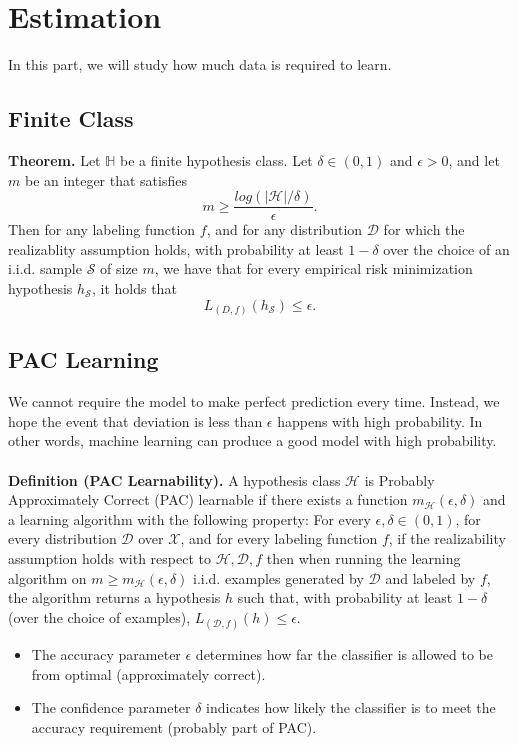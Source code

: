 \documentclass{article}
\begin{document}
   \clearpage
   \section{Estimation}
   In this part, we will study how much data is required to learn.
   \subsection{Finite Class}
   \textbf{Theorem.} Let $\mathbb{H}$ be a finite hypothesis class. Let $\delta \in (0,1)$ and $\epsilon > 0$, and let $m$ be an integer that satisfies 
   \begin{equation}
   m \geq \frac{log(|\mathcal{H}|/\delta)}{\epsilon}.
   \end{equation}
   Then for any labeling function $f$, and for any distribution $\mathcal{D}$ for which the realizablity assumption holds, with probability at least $1 - \delta$ over the choice of an i.i.d. sample $\mathcal{S}$ of size $m$, we have that for every empirical risk minimization hypothesis $h_\mathcal{S}$, it holds that 
   \begin{equation}
   L_{(D,f)}(h_\mathcal{S}) \leq \epsilon.
   \end{equation}
   
   \subsection{PAC Learning}
   We cannot require the model to make perfect prediction every time. Instead, we hope the event that deviation is less than $\epsilon$ happens with high probability. In other words, machine learning can produce a good model with high probability.
   \\\\
   \textbf{Definition (PAC Learnability).} A hypothesis class $\mathcal{H}$ is Probably Approximately Correct (PAC) learnable if there exists a function $m_\mathcal{H}(\epsilon,\delta)$ and a learning algorithm with the following property: For every $\epsilon,\delta \in (0,1)$,  for every distribution $\mathcal{D}$ over $\mathcal{X}$, and for every labeling function $f$, if the realizability assumption holds with respect to $\mathcal{H}, \mathcal{D}, f$ then when running the learning algorithm on $m \geq m_\mathcal{H}(\epsilon,\delta)$ i.i.d. examples generated by $\mathcal{D}$ and labeled by $f$, the algorithm returns a hypothesis $h$ such that, with probability at least $1-\delta$ (over the choice of examples), $L_{(\mathcal{D}, f)} (h) \leq \epsilon$.
   \begin{itemize}
   \item The accuracy parameter $\epsilon$ determines how far the classifier is allowed to be from optimal (approximately correct).
   \item The confidence parameter $\delta$ indicates how likely the classifier is to meet the accuracy requirement (probably part of PAC).
   \end{itemize}
   
\end{document}
